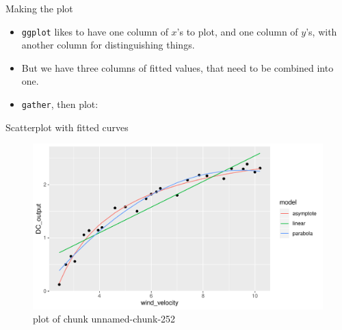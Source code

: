 \documentclass[ignorenonframetext,]{beamer}
\newenvironment{Shaded}{\begin{snugshade}}{\end{snugshade}}
\newcommand{\DataTypeTok}[1]{\textcolor[rgb]{0.13,0.29,0.53}{#1}}
\newcommand{\KeywordTok}[1]{\textcolor[rgb]{0.13,0.29,0.53}{\textbf{#1}}}
\newcommand{\NormalTok}[1]{#1}
\newcommand{\OperatorTok}[1]{\textcolor[rgb]{0.81,0.36,0.00}{\textbf{#1}}}
\newcommand{\StringTok}[1]{\textcolor[rgb]{0.31,0.60,0.02}{#1}}
\providecommand{\tightlist}{%
  \setlength{\itemsep}{0pt}\setlength{\parskip}{0pt}}
\begin{document}
\begin{frame}[fragile]{Making the plot}
\protect\hypertarget{making-the-plot}{}

\begin{itemize}
\tightlist
\item
  \texttt{ggplot} likes to have one column of \(x\)'s to plot, and one
  column of \(y\)'s, with another column for distinguishing things.
\item
  But we have three columns of fitted values, that need to be combined
  into one.
\item
  \texttt{gather}, then plot:
\end{itemize}

\begin{Shaded}
\end{Shaded}

\end{frame}

\begin{frame}{Scatterplot with fitted curves}
\protect\hypertarget{scatterplot-with-fitted-curves}{}

\begin{figure}
\centering
\includegraphics{figure/unnamed-chunk-252-1.pdf}
\caption{plot of chunk unnamed-chunk-252}
\end{figure}

\end{frame}
\end{document}
